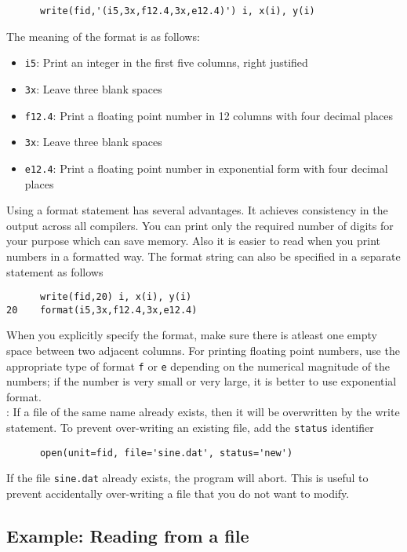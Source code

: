 \documentclass[11pt,oneside]{amsart}
\begin{document}
\begin{verbatim}
      write(fid,'(i5,3x,f12.4,3x,e12.4)') i, x(i), y(i)
\end{verbatim}
The meaning of the format is as follows:
\begin{itemize}
\item {\tt i5}: Print an integer in the first five columns, right justified
\item {\tt 3x}: Leave three blank spaces
\item {\tt f12.4}: Print a floating point number in 12 columns with four decimal places
\item {\tt 3x}: Leave three blank spaces
\item {\tt e12.4}: Print a floating point number in exponential form with four decimal places
\end{itemize}
Using a format statement has several advantages. It achieves consistency in the output across all compilers. You can print only the required number of digits for your purpose which can save memory. Also it is easier to read when you print numbers in a formatted way. The format string can also be specified in a separate statement as follows
\begin{verbatim}
      write(fid,20) i, x(i), y(i)
20    format(i5,3x,f12.4,3x,e12.4)
\end{verbatim}
When you explicitly specify the format, make sure there is atleast one empty space between two adjacent columns. For printing floating point numbers, use the appropriate type of format {\tt f} or {\tt e} depending on the numerical magnitude of the numbers; if the number is very small or very large, it is better to use exponential format. \\

: If a file of the same name already exists, then it will be overwritten by the write statement. To prevent over-writing an existing file, add the {\tt status} identifier
\begin{verbatim}
      open(unit=fid, file='sine.dat', status='new')
\end{verbatim}
If the file {\tt sine.dat} already exists, the program will abort. This is useful to prevent accidentally over-writing a file that you do not want to modify.

\subsection{Example: Reading from a file}
\end{document}
